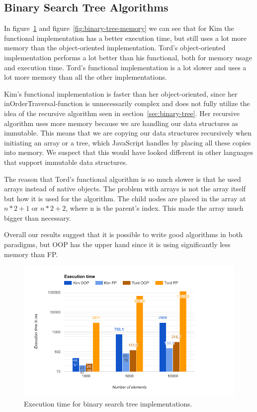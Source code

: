 \documentclass {article}
\begin{document}
\subsection{Binary Search Tree Algorithms}
In figure~\ref{fig:binary-tree-runtime} and figure~\ref{fig:binary-tree-memory} we can see that for Kim the functional implementation has a better execution time, but still uses a lot more memory than the object-oriented implementation. Tord's object-oriented implementation performs a lot better than his functional, both for memory usage and execution time. Tord's functional implementation is a lot slower and uses a lot more memory than all the other implementations.
 
Kim's functional implementation is faster than her object-oriented, since her inOrderTraversal-function is unnecessarily complex and does not fully utilize the idea of the recursive algorithm seen in section~\ref{sec:binary-tree}. Her recursive algorithm uses more memory because we are handling our data structures as immutable. This means that we are copying our data structures recursively when initiating an array or a tree, which JavaScript handles by placing all these copies into memory. We suspect that this would have looked different in other languages that support immutable data structures. 
 
The reason that Tord’s functional algorithm is so much slower is that he used arrays instead of native objects. The problem with arrays is not the array itself but how it is used for the algorithm. The child nodes are placed in the array at \(n * 2 + 1\) or \(n * 2 + 2\), where n is the parent's index. This made the array much bigger than necessary. 
 
Overall our results suggest that it is possible to write good algorithms in both paradigms, but OOP has the upper hand since it is using significantly less memory than FP.
 
\begin{figure}[H]
\centering
\includegraphics[width=\textwidth]{binary-tree-runtime}

\caption{Execution time for binary search tree implementations.}
\label{fig:binary-tree-runtime}
\end{figure}
 
\end{document}

